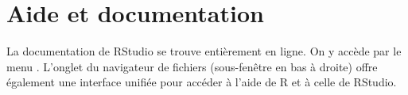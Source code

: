 \section{Aide et documentation}
\label{sec:rstudio:aide}

La documentation de RStudio se trouve entièrement en ligne. On y
accède par le menu . L'onglet  du navigateur de
fichiers (sous-fenêtre en bas à droite) offre également une interface
unifiée pour accéder à l'aide de R et à celle de RStudio.


